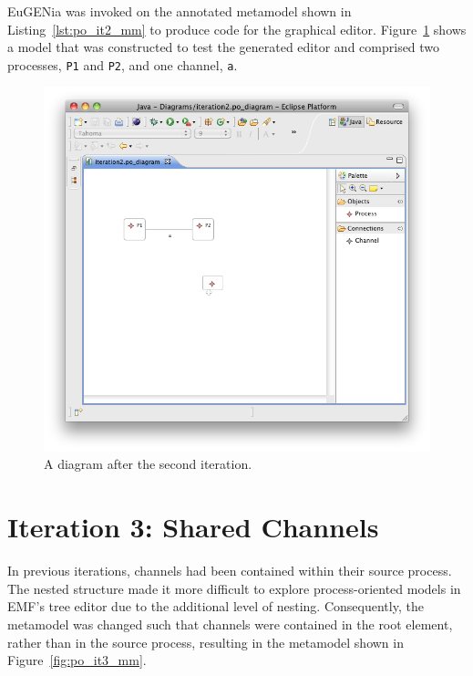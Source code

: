EuGENia was invoked on the annotated metamodel shown in Listing~\ref{lst:po_it2_mm} to produce code for the graphical editor. Figure~\ref{fig:po_it2_model} shows a model that was constructed to test the generated editor and comprised two processes, \texttt{P1} and \texttt{P2}, and one channel, \texttt{a}.

\begin{figure}[htbp]
	\centering
		\includegraphics[scale=0.5]{A.2.ProcessOriented/images/2_model.png}
	\caption{A diagram after the second iteration.}
	\label{fig:po_it2_model}
\end{figure}

\section{Iteration 3: Shared Channels}
In previous iterations, channels had been contained within their source process. The nested structure made it more difficult to explore process-oriented models in EMF's tree editor due to the additional level of nesting. Consequently, the metamodel was changed such that channels were contained in the root element, rather than in the source process, resulting in the metamodel shown in Figure~\ref{fig:po_it3_mm}.

